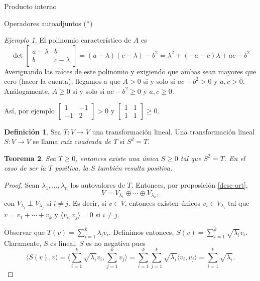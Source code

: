 \documentclass[a4paper,12pt,twoside,spanish,reqno]{amsbook}
\numberwithin{equation}{section}
\newtheorem{teorema}{Teorema}[section]
\theoremstyle{definition}
\newtheorem{definicion}[teorema]{Definici\'on}
\theoremstyle{remark}
\newtheorem*{ejemplo*}{Ejemplo}
\newcommand{\la}{\langle}
\newcommand{\ra}{\rangle}
\begin{document}
\begin{chapter}{Producto interno}
\begin{section}{Operadores autoadjuntos (*)}
\begin{ejemplo*}
            El polinomio característico de $A$ es 
            $$
            \det \begin{bmatrix} 
            a-\lambda &b\\b&c -\lambda
            \end{bmatrix} =
            (a-\lambda)(c -\lambda) - b^2 = \lambda^2 +(-a-c)\lambda + ac - b^2
            $$
            Averiguando las raíces de este polinomio y exigiendo que ambas sean mayores que cero (hacer la cuenta), llegamos a que $A>0$ si y solo si $ac - b^2 > 0$ y $a,c >0$. Análogamente, $A\ge 0$ si y solo si $ac - b^2 \ge 0$ y $a,c \ge0$. 
            
            Así, por ejemplo $\begin{bmatrix}
            1&-1\\-1&2
            \end{bmatrix} > 0$  y  $\begin{bmatrix}
            1&1\\1&1
            \end{bmatrix} \ge 0$.	
        \end{ejemplo*}
        
        
        \begin{definicion}
            Sea $T: V \to V$ una transformación lineal. Una transformación  lineal $S: V \to V$  se llama \textit{raíz cuadrada de $T$} si $S^2 = T$.
        \end{definicion}
        
        
        
        \begin{teorema}
            Sea $T \ge 0$, entonces existe una única $S \ge 0$ tal que $S^2 = T$. En el caso de ser la $T$ positiva,  la $S$ también resulta positiva.
        \end{teorema}
        \begin{proof}
            Sean  $\lambda_1,\ldots,\lambda_n$ los autovalores de $T$. Entonces, por proposición \ref{desc-ort}, 
                $$
            V = V_{\lambda_1}\oplus \cdots \oplus V_{\lambda_k},
            $$
            con  $V_{\lambda_i} \perp V_{\lambda_j}$  si $i \ne j$. Es decir, si $v \in V$, entonces existen únicos $v_i \in V_{\lambda_i}$ tal que $v = v_1+\cdots+v_k$ y $\la v_i,v_j \ra = 0$ si $i \ne j$.
            
             Observar que $T(v)= \sum_{i=1}^k {\lambda_i}v_i$. Definimos entonces, $S(v) = \sum_{i=1}^k \sqrt{\lambda_i} v_i$.  Claramente, $S$ es lineal. $S$ es no negativa pues
             $$
             \la S(v),v \ra =  \la \sum_{i=1}^k \sqrt{\lambda_i} v_i,\sum_{j=1}^k  v_j \ra  = 
             \sum_{i=1}^k\sum_{j=1}^k \sqrt{\lambda_i}\la  v_i,  v_j \ra  = \sum_{i=1}^k \sqrt{\lambda_i}.
             $$
             

\end{proof}
\end{section}
\end{chapter}
\end{document}
